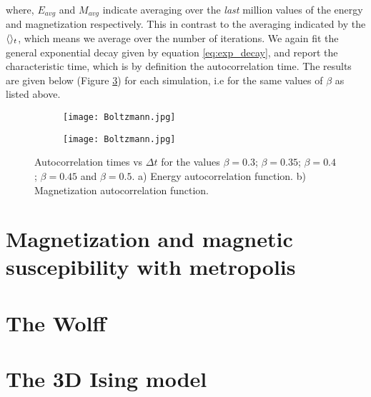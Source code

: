 \documentclass[11pt,a4paper]{article}
\DeclarePairedDelimiter{\avg}{\langle}{\rangle}
\begin{document}
where, $E_{avg}$ and $M_{avg}$ indicate averaging over the \textit{last} million values of the energy and magnetization
 respectively. This in contrast to the averaging indicated by the $\avg{}_t$, which means we average over the number of
 iterations. We again fit the general exponential decay given by equation \ref{eq:exp_decay}, and report the characteristic
 time, which is by definition the autocorrelation time. The results are given below (Figure \ref{fig:autocorr})
 for each simulation, i.e for the same values of $\beta$ as listed above.
 
\begin{figure}[h!]
\centering
\begin{subfigure}{.5\textwidth}
  \centering
  \texttt{[image: Boltzmann.jpg]}
  \caption{}
  \label{fig:autocorr_energy}
\end{subfigure}%
\begin{subfigure}{.5\textwidth}
  \centering
  \texttt{[image: Boltzmann.jpg]}
  \caption{}
  \label{fig:autocorr_mag}
\end{subfigure}
\caption{Autocorrelation times vs $\Delta t$ for the values $\beta = 0.3$; $\beta = 0.35$;
         $\beta = 0.4$; $\beta = 0.45$ and $\beta = 0.5$. a) Energy autocorrelation function. 
         b) Magnetization autocorrelation function.}
\label{fig:autocorr}
\end{figure}


\section{Magnetization and magnetic suscepibility with metropolis}

\section{The Wolff}

\section{The 3D Ising model}
\end{document}
